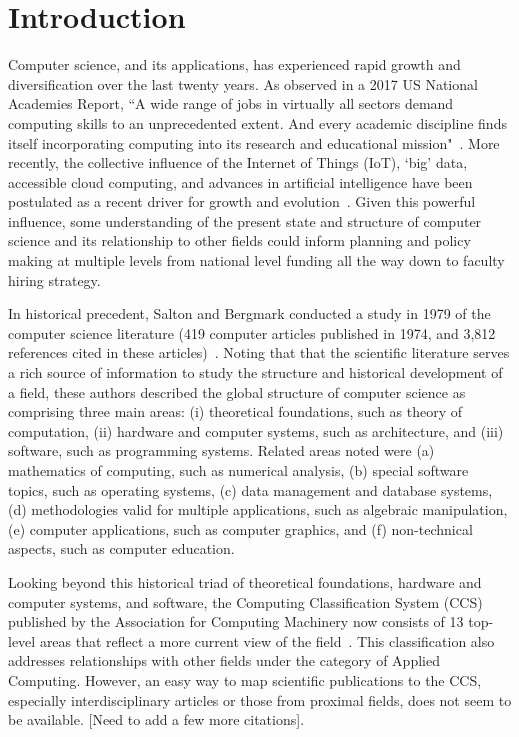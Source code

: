 \section{Introduction}
\label{intro}

Computer science, and its applications, has experienced rapid growth and diversification over the last twenty years. As observed in a 2017 US National Academies Report, ``A wide range of jobs in virtually all sectors demand computing skills to an unprecedented extent. And every academic discipline finds itself incorporating computing into its research and educational mission"~\cite{nas_2017}. More recently, the collective influence of the Internet of Things (IoT), `big' data, accessible cloud computing, and advances in artificial intelligence have been postulated as a recent driver for growth and evolution~\cite{siebel2019_digital}. Given this powerful influence, some understanding of the present state and structure of computer science and its relationship to other fields could inform planning and policy making at multiple levels from national level funding all the way down to faculty hiring strategy.  

In historical precedent, Salton and Bergmark conducted a study  in 1979 of the computer science literature (419 computer articles published in 1974,  and 3,812 references cited in these articles)~\cite{salton_citation_1979}. Noting that that the scientific literature serves a rich source of information to study the structure and historical development of a field, these authors described the global structure of computer science as comprising three main areas: (i) theoretical foundations, such as theory of computation, (ii) hardware and computer systems, such as architecture,  and (iii) software, such as programming systems.  Related areas noted were (a) mathematics of computing, such as numerical analysis, (b) special software topics, such as operating systems, (c) data management and database systems, (d) methodologies valid for multiple applications, such as algebraic manipulation, (e) computer applications, such as computer graphics, and  (f) non-technical aspects, such as computer education. 

Looking beyond this historical triad of theoretical foundations, hardware and computer systems, and software, the Computing Classification System (CCS) published by the Association for Computing Machinery now consists of 13 top-level areas that reflect a more current view of the field~\cite{acm_ref}. This classification also addresses relationships with other fields under the category of Applied Computing. However, an easy way to map scientific publications to the CCS, especially interdisciplinary articles or those from proximal fields, does not seem to be available. [Need to add a few more citations].

